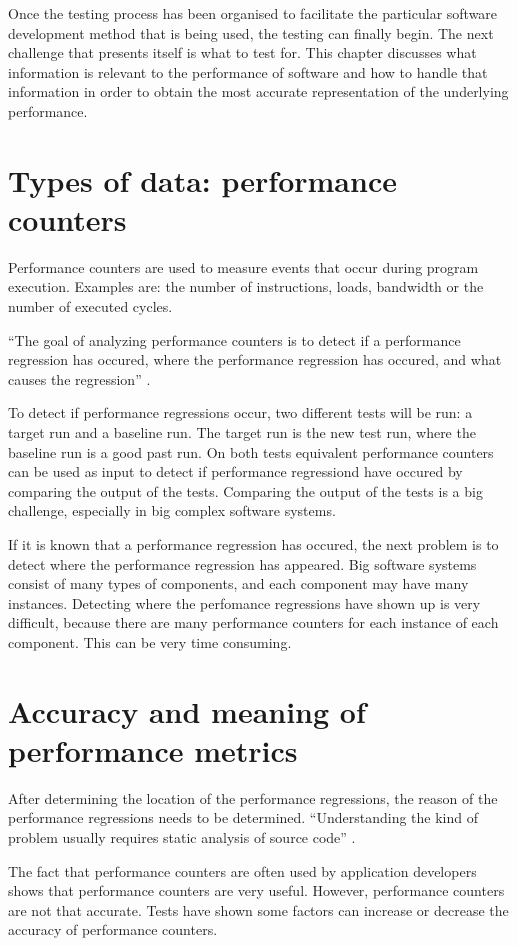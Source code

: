Once the testing process has been organised to facilitate the particular software development method that is being used, the testing can finally begin. The next challenge that presents itself is what to test for. This chapter discusses what information is relevant to the performance of software and how to handle that information in order to obtain the most accurate representation of the underlying performance.

\section{Types of data: performance counters}
Performance counters are used to measure events that occur during program execution\cite{PC}. Examples are: the number of instructions, loads, bandwidth or the number of executed cycles.

``The goal of analyzing performance counters is to detect if a performance regression has occured, where the performance regression has occured, and what causes the regression'' \cite{nguyen2012using}.

To detect if performance regressions occur, two different tests will be run: a target run and a baseline run. The target run is the new test run, where the baseline run is a good past run. On both tests equivalent performance counters can be used as input to detect if performance regressiond have occured by comparing the output of the tests. Comparing the output of the tests is a big challenge, especially in big complex software systems.

If it is known that a performance regression has occured, the next problem is to detect where the performance regression has appeared. Big software systems consist of many types of components, and each component may have many instances. Detecting where the perfomance regressions have shown up is very difficult, because there are many performance counters for each instance of each component. This can be very time consuming.

\section{Accuracy and meaning of performance metrics}
After determining the location of the performance regressions, the reason of the performance regressions needs to be determined. ``Understanding the kind of problem usually requires static analysis of source code'' \cite{nguyen2012using}.

The fact that performance counters are often used by application developers shows that performance counters are very useful. However, performance counters are not that accurate. Tests have shown some factors can increase or decrease the accuracy of performance counters.

